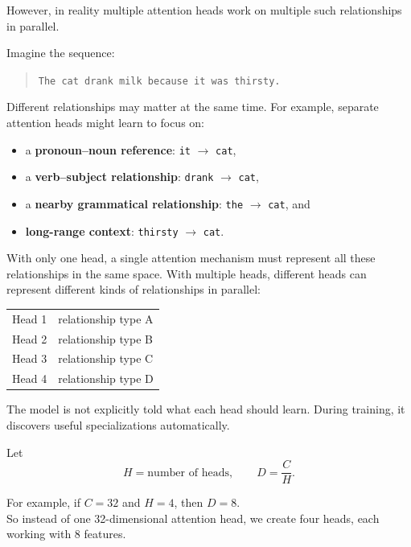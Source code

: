 However, in reality multiple attention heads work on multiple such relationships in parallel.

Imagine the sequence:
\begin{quote}
  \texttt{The cat drank milk because it was thirsty.}
\end{quote}
Different relationships may matter at the same time. For example, separate
attention heads might learn to focus on:
\begin{itemize}
  \setlength{\itemsep}{0.25em}
  \item a \textbf{pronoun--noun reference}: \texttt{it} \(\longrightarrow\) \texttt{cat},
  \item a \textbf{verb--subject relationship}: \texttt{drank} \(\longrightarrow\)
        \texttt{cat},
  \item a \textbf{nearby grammatical relationship}: \texttt{the}
        \(\longrightarrow\) \texttt{cat}, and
  \item \textbf{long-range context}: \texttt{thirsty} \(\longrightarrow\) \texttt{cat}.
\end{itemize}

With only one head, a single attention mechanism must represent all these
relationships in the same space. With multiple heads, different heads can
represent different kinds of relationships in parallel:
\begin{center}
\begin{tabular}{@{}ll@{}}
Head 1 & relationship type A \\
Head 2 & relationship type B \\
Head 3 & relationship type C \\
Head 4 & relationship type D
\end{tabular}
\end{center}

The model is not explicitly told what each head should learn. During training,
it discovers useful specializations automatically.

Let
\[
  H=\text{number of heads},
  \qquad
  D=\frac{C}{H}.
\]

For example, if \(C=32\) and \(H=4\), then \(D=8\). \\

So instead of one 32-dimensional attention head, we create four heads, each working with 8 features.


